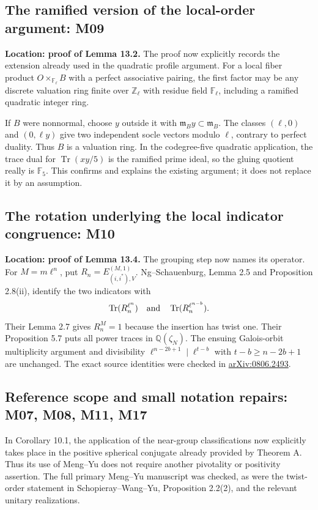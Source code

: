 \documentclass[11pt,a4paper]{article}
\newcommand{\Tr}{\operatorname{Tr}}
\begin{document}
\subsection{The ramified version of the local-order argument: M09}

\textbf{Location: proof of Lemma 13.2.}
The proof now explicitly records the extension already used in the
quadratic profile argument. For a local fiber product
$O\times_{\mathbb F_\ell}B$ with a perfect associative pairing, the
first factor may be any discrete valuation ring finite over
$\mathbb Z_\ell$ with residue field $\mathbb F_\ell$, including a
ramified quadratic integer ring.

If $B$ were nonnormal, choose $y$ outside it with
$\mathfrak m_B y\subset\mathfrak m_B$. The classes $(\ell,0)$ and
$(0,\ell y)$ give two independent socle vectors modulo $\ell$,
contrary to perfect duality. Thus $B$ is a valuation ring. In the
codegree-five quadratic application, the trace dual for
$\Tr(xy/5)$ is the ramified prime ideal, so the gluing quotient really
is $\mathbb F_5$. This confirms and explains the existing argument;
it does not replace it by an assumption.

\subsection{The rotation underlying the local indicator congruence: M10}

\textbf{Location: proof of Lemma 13.4.}
The grouping step now names its operator. For $M=m\ell^n$, put
$R_n=E^{(M,1)}_{(i,i^*),V}$. Ng--Schauenburg,
Lemma 2.5 and Proposition 2.8(ii), identify the two indicators with
\[
 \Tr(R_n^{\ell^n})\quad\hbox{and}\quad
 \Tr(R_n^{\ell^{n-b}}).
\]
Their Lemma 2.7 gives $R_n^M=1$ because the insertion has twist one.
Their Proposition 5.7 puts all power traces in $\mathbb Q(\zeta_N)$.
The ensuing Galois-orbit multiplicity argument and divisibility
$\ell^{n-2b+1}\mid\ell^{t-b}$ with $t-b\ge n-2b+1$ are unchanged.
The exact source identities were checked in
\href{https://arxiv.org/abs/0806.2493}{arXiv:0806.2493}.

\subsection{Reference scope and small notation repairs: M07, M08, M11, M17}

In Corollary 10.1, the application of the near-group classifications now
explicitly takes place in the positive spherical conjugate already
provided by Theorem A. Thus its use of Meng--Yu does not require another
pivotality or positivity assertion. The full primary Meng--Yu manuscript
was checked, as were the twist-order statement in Schopieray--Wang--Yu,
Proposition 2.2(2), and the relevant unitary realizations.
\end{document}
